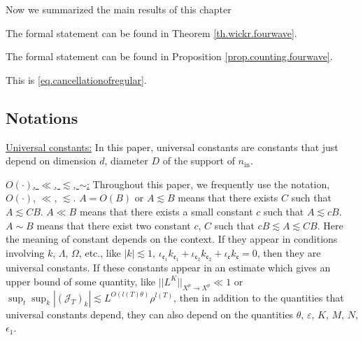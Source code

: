 Now we summarized the main results of this chapter


\begin{thm}\label{th.wickr_informal.fourwave} The formal statement can be found in Theorem \ref{th.wickr.fourwave}.
\end{thm}

\begin{thm}\label{th.loop_informal.fourwave}  The formal statement can be found in Proposition \ref{prop.counting.fourwave}.
\end{thm}

\begin{thm}\label{th.cancellation_informal.fourwave} This is \eqref{eq.cancellationofregular}.
\end{thm}

 






 






 
\subsection{Notations}\label{sec.notat.fourwave} 

\underline{Universal constants:} In this paper, universal constants are constants that just depend on dimension $d$, diameter $D$ of the support of $n_{\text{in}}$. 

\underline{$O(\cdot)$, $\ll$, $\lesssim$, $\sim$:} Throughout this paper, we frequently use the notation, $O(\cdot)$, $\ll$, $\lesssim$. $A=O(B)$ or $A\lesssim B$ means that there exists $C$ such that $A\lesssim CB$. $A\ll B$ means that there exists a small constant $c$ such that $A\lesssim cB$. $A\sim B$ means that there exist two constant $c$, $C$ such that $cB\lesssim A\lesssim CB$. Here the meaning of constant depends on the context. If they appear in conditions involving $k$, $\Lambda$, $\Omega$, etc., like $|k|\lesssim 1$, $\iota_{\mathfrak{e}_1}k_{\mathfrak{e}_1}+\iota_{\mathfrak{e}_2}k_{\mathfrak{e}_2}+\iota_{\mathfrak{e}}k_{\mathfrak{e}}=0$, then they are universal constants. If these constants appear in an estimate which gives an upper bound of some quantity, like $||L^K||_{X^p\rightarrow X^p}\ll 1$ or $\sup_t\sup_k |(\mathcal{J}_T)_k|\lesssim L^{O(l(T)\theta)} \rho^{l(T)}$, then in addition to the quantities that universal constants depend, they can also depend on the quantities $\theta$, $\varepsilon$, $K$, $M$, $N$, $\epsilon_1$.

